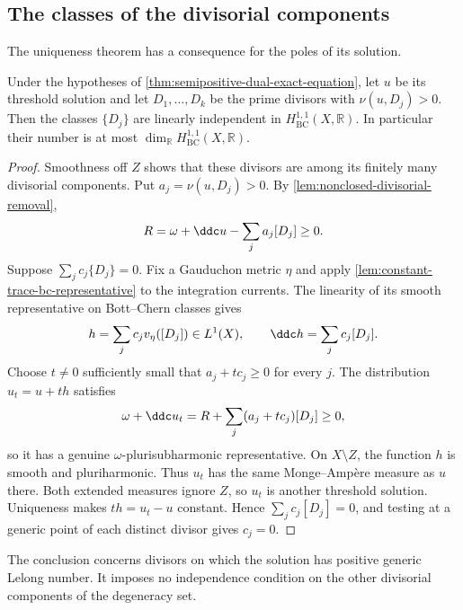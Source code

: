 \subsection{The classes of the divisorial components}

The uniqueness theorem has a consequence for the poles of its solution.

\begin{corollary}\label{cor:semipositive-dual-divisor-independence}
Under the hypotheses of \cref{thm:semipositive-dual-exact-equation}, let $u$ be its threshold solution and let $D_1,\ldots,D_k$ be the prime divisors with $\nu(u,D_j)>0$. Then the classes $\{D_j\}$ are linearly independent in $H^{1,1}_{\mathrm{BC}}(X,\mathbb R)$. In particular their number is at most $\dim_{\mathbb R}H^{1,1}_{\mathrm{BC}}(X,\mathbb R)$.
\end{corollary}
\begin{proof}
Smoothness off $Z$ shows that these divisors are among its finitely many divisorial components. Put $a_j=\nu(u,D_j)>0$. By \cref{lem:nonclosed-divisorial-removal},
\[
 R=\omega+\ddc u-\sum_j a_j[D_j]\geq0.
\]
Suppose $\sum_j c_j\{D_j\}=0$. Fix a Gauduchon metric $\eta$ and apply \cref{lem:constant-trace-bc-representative} to the integration currents. The linearity of its smooth representative on Bott--Chern classes gives
\[
 h=\sum_j c_j v_\eta([D_j])\in L^1(X),\qquad
 \ddc h=\sum_j c_j[D_j].
\]
Choose $t\ne0$ sufficiently small that $a_j+tc_j\geq0$ for every $j$. The distribution $u_t=u+th$ satisfies
\[
 \omega+\ddc u_t=R+\sum_j(a_j+tc_j)[D_j]\geq0,
\]
so it has a genuine $\omega$-plurisubharmonic representative. On $X\setminus Z$, the function $h$ is smooth and pluriharmonic. Thus $u_t$ has the same Monge--Amp\`ere measure as $u$ there. Both extended measures ignore $Z$, so $u_t$ is another threshold solution. Uniqueness makes $th=u_t-u$ constant. Hence $\sum_jc_j[D_j]=0$, and testing at a generic point of each distinct divisor gives $c_j=0$.
\end{proof}

The conclusion concerns divisors on which the solution has positive generic Lelong number. It imposes no independence condition on the other divisorial components of the degeneracy set.
